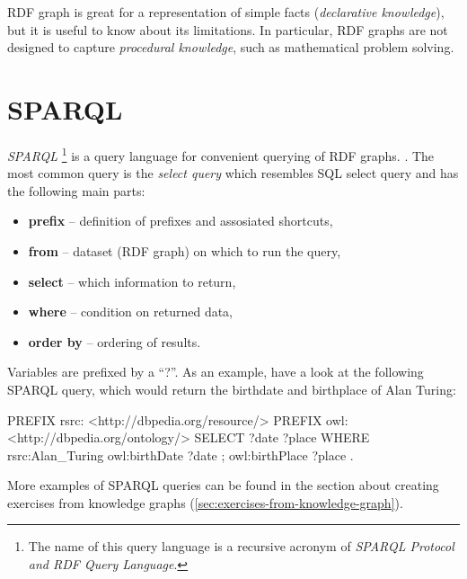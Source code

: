 \documentclass[12pt, twoside]{fithesis2}		%
\renewcommand{\_}{\leavevmode \kern0.07em\vbox{\hrule width0.4em}}
\newcommand{\squarebullet}{\textcolor{black}{\raisebox{0.15em}{\rule{4pt}{4pt}}}}
\newcommand{\emptysquarebullet}{\textcolor{black}{\raisebox{0.10em}{\tiny$\square$}}}
\newenvironment{myItemize}{
  \begin{itemize}[leftmargin=2em,rightmargin=1em,itemsep=\parskip ,parsep=0em,topsep=0em,partopsep=0em]
  \renewcommand{\labelitemi}{\squarebullet}
  \renewcommand{\labelitemii}{\textbullet}
}{
  \end{itemize}
}
\begin{document}
RDF graph is great for a representation of simple facts (\emph{declarative knowledge}),
but it is useful to know about its limitations.
In particular, RDF graphs are not designed to capture \textit{procedural knowledge}, such as mathematical problem solving.



\section{SPARQL}
\label{sec:sparql}

\textit{SPARQL}%
\footnote{The name of this query language is a recursive acronym of \textit{SPARQL Protocol and RDF Query Language}.}
is a query language for convenient querying of RDF graphs. \parencite[][84]{semantic-web}.
The most common query is the \textit{select query} which resembles SQL select query and has the following main parts:
\begin{myItemize}
  \item \textbf{prefix} -- definition of prefixes and assosiated shortcuts,
  \item \textbf{from} -- dataset (RDF graph) on which to run the query,
  \item \textbf{select} -- which information to return,
  \item \textbf{where} -- condition on returned data,
  \item \textbf{order by} -- ordering of results.
\end{myItemize}
Variables are prefixed by a ``?''. As an example, have a look at the following SPARQL query, which would return the birthdate and birthplace of Alan Turing:
\begin{code}
PREFIX rsrc: <http://dbpedia.org/resource/>
PREFIX owl: <http://dbpedia.org/ontology/>
SELECT ?date ?place
WHERE {
  rsrc:Alan_Turing owl:birthDate ?date ;
                     owl:birthPlace ?place .
}
\end{code}

More examples of SPARQL queries can be found in the section about creating exercises from knowledge graphs
(\autoref{sec:exercises-from-knowledge-graph}).

\end{document}
